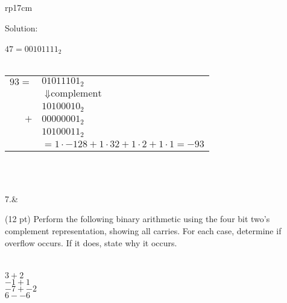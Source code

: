 \documentclass{article}
\begin{document}
\begin{longtable}[l]{rp{17cm}}
\begin{minipage}[t]{\linewidth}
Solution: \\
\\
$47 = 00101111_2$\\
\\
\begin{tabular}{rl}
  $93 =$ & $01011101_2$\\
         & $\Downarrow \textrm{complement}$\\
         & $10100010_2$\\
     $+$ & $00000001_2$\\
         & $10100011_2$\\
         & $= 1 \cdot -128 + 1 \cdot 32 + 1 \cdot 2 + 1 \cdot 1 = -93$
\end{tabular}\\
\end{minipage}\\
\medskip
7.&\begin{minipage}[t]{\linewidth}(12 pt) Perform the following binary arithmetic using the four bit two's complement representation, showing all carries.  For each case, determine if overflow occurs. If it does, state why it occurs.\\
\\
\\
$3 + 2$\\
$-1 + 1$\\
$-7 + -2$\\
$6 - -6$\\


\end{minipage}
\end{longtable}
\end{document}
